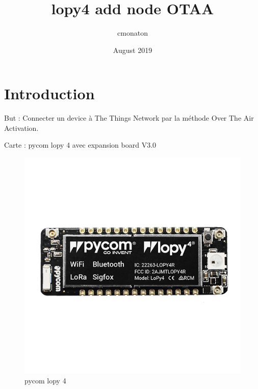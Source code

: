 \documentclass{article}
\title{ lopy4 add node OTAA}
\author{cmonaton }
\date{August 2019}
\begin{document}
\maketitle





\section{Introduction}
But : Connecter un device à The Things Network par la méthode Over The Air Activation. 

Carte : pycom lopy 4 avec expansion board V3.0



\begin{figure}[H]
  \centering
  \begin{minipage}[b]{0.4\textwidth}
    \includegraphics[keepaspectratio=true,scale=1.7]{pycom_lopy4.jpeg}
        \caption{pycom lopy 4}
  \end{minipage}
  \hfill
  \begin{minipage}[b]{0.4\textwidth}

\end{minipage}
\end{figure}
\end{document}
